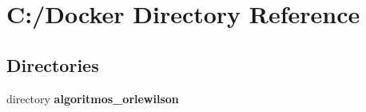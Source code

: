 \section{C\+:/\+Docker Directory Reference}
\label{dir_30bbeebfa65335c6cc72e6278868e5b3}
\subsection*{Directories}
\begin{DoxyCompactItemize}
\item 
directory \textbf{ algoritmos\+\_\+orlewilson}
\end{DoxyCompactItemize}
